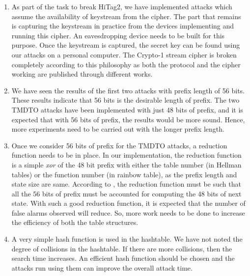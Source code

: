 \begin{enumerate}
\item As part of the task to break HiTag2, we have implemented attacks which assume the availability of keystream from the cipher. The part that remains is capturing the keystream in practice from the devices implementing and running this cipher. An eavesdropping device needs to be built for this purpose. Once the keystream is captured, the secret key can be found using our attacks on a personal computer. The Crypto-1 stream cipher is broken completely according to this philosophy as both the protocol and the cipher working are published through different works. 

\item We have seen the results of the first two attacks with prefix length of 56 bits. These results indicate that 56 bits is the desirable length of prefix. The two TMDTO attacks have been implemented with just 48 bits of prefix, and it is expected that with 56 bits of prefix, the results would be more sound. Hence, more experiments need to be carried out with the longer prefix length.

\item Once we consider 56 bits of prefix for the TMDTO attacks, a reduction function needs to be in place. In our implementation, the reduction function is a simple \textit{xor} of the 48 bit prefix with either the table number (in Hellman tables) or the function number (in rainbow table), as the prefix length and state size are same. According to \cite{email-karsten}, the reduction function must be such that all the 56 bits of prefix must be accounted for computing the 48 bits of next state. With such a good reduction function, it is expected that the number of false alarms observed will reduce. So, more work needs to be done to increase the efficiency of both the table structures.

\item A very simple hash function is used in the hashtable. We have not noted the degree of collisions in the hashtable. If there are more collisions, then the search time increases. An efficient hash function should be chosen and the attacks run using them can improve the overall attack time. 
\end{enumerate}